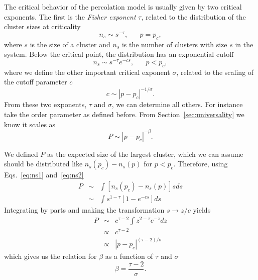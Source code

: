 The critical behavior of the percolation model is usually given by two critical
exponents. The first is the \textit{Fisher exponent} $\tau$, related to
the distribution of the cluster sizes at criticality
\begin{equation}
    \label{eq:ns1}
    n_s\sim s^{-\tau},\;\;\;\;\;\;p=p_c,
\end{equation}
where $s$ is the size of a cluster and $n_s$ is the number of clusters with
size $s$ in the system. Below the critical point, the distribution has an
exponential cutoff
\begin{equation}
    \label{eq:ns2}
    n_s\sim s^{-\tau}e^{-cs},\;\;\;\;\;\;p<p_c,
\end{equation}
where we define the other important critical exponent $\sigma$, related
to the scaling of the cutoff parameter $c$
\begin{equation}
    \label{eq:sig}
    c\sim \left|p-p_c\right|^{-1/\sigma}.
\end{equation}
From these two exponents, $\tau$ and $\sigma$, we can determine all others.
For instance take the order parameter as defined before. From
Section~\ref{sec:universality} we know it scales as
\begin{equation}
    P\sim\left|p-p_c\right|^{-\beta}.
\end{equation}

We defined $P$ as the expected size of the largest cluster, which
we can assume should be distributed like $n_s(p_c)-n_s(p)$ for
$p < p_c$. Therefore, using Eqs.~\ref{eq:ns1} and~\ref{eq:ns2}
\begin{eqnarray}
    P & \sim & \int\left[n_{s}\left(p_{c}\right)-n_{s}\left(p\right)\right]sds\\
      & \sim & \int s^{1-\tau}\left[1-e^{-cs}\right]ds
\end{eqnarray}
Integrating by parts and making the transformation $s\rightarrow z/c$ yields
\begin{eqnarray}
P & \sim & c^{\tau-2}\int z^{2-\tau}e^{-z}dz\\
 & \propto & c^{\tau-2}\\
 & \propto & \left|p-p_{c}\right|^{\left(\tau-2\right)/\sigma}
\end{eqnarray}
which gives us the relation for $\beta$ as a function of $\tau$ and $\sigma$
\begin{equation}
    \beta=\frac{\tau-2}{\sigma}.
\end{equation}
    
